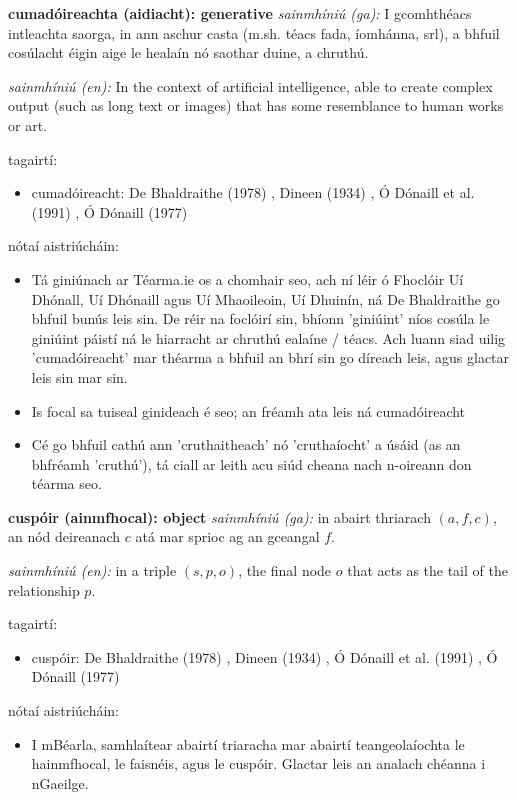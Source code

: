 \documentclass{article}
\begin{document}
\textbf{cumadóireachta (aidiacht): generative}
\textit{sainmhíniú (ga):} I gcomhthéacs intleachta saorga, in ann aschur casta (m.sh. téacs fada, íomhánna, srl), a bhfuil cosúlacht éigin aige le healaín nó saothar duine, a chruthú.

\textit{sainmhíniú (en):} In the context of artificial intelligence, able to create complex output (such as long text or images) that has some resemblance to human works or art.

tagairtí:
\begin{itemize}
	\item cumadóireacht: De Bhaldraithe (1978) \cite{de-bhaldraithe}, Dineen (1934) \cite{dineen}, Ó Dónaill et al. (1991) \cite{focloir-beag}, Ó Dónaill (1977) \cite{odonaill}
\end{itemize}

nótaí aistriúcháin:
\begin{itemize}
	\item Tá giniúnach ar Téarma.ie os a chomhair seo, ach ní léir ó Fhoclóir Uí Dhónall, Uí Dhónaill agus Uí Mhaoileoin, Uí Dhuinín, ná De Bhaldraithe go bhfuil bunús leis sin. De réir na foclóirí sin, bhíonn 'giniúint' níos cosúla le giniúint páistí ná le hiarracht ar chruthú ealaíne / téacs. Ach luann siad uilig 'cumadóireacht' mar théarma a bhfuil an bhrí sin go díreach leis, agus glactar leis sin mar sin.
	\item Is focal sa tuiseal ginideach é seo; an fréamh ata leis ná cumadóireacht
	\item Cé go bhfuil cathú ann 'cruthaitheach' nó 'cruthaíocht' a úsáid (as an bhfréamh 'cruthú'), tá ciall ar leith acu siúd cheana nach n-oireann don téarma seo.
\end{itemize}


\textbf{cuspóir (ainmfhocal): object}
\textit{sainmhíniú (ga):} in abairt thriarach $(a,f,c)$, an nód deireanach $c$ atá mar sprioc ag an gceangal $f$.

\textit{sainmhíniú (en):} in a triple $(s,p,o)$, the final node $o$ that acts as the tail of the relationship $p$.

tagairtí:
\begin{itemize}
	\item cuspóir: De Bhaldraithe (1978) \cite{de-bhaldraithe}, Dineen (1934) \cite{dineen}, Ó Dónaill et al. (1991) \cite{focloir-beag}, Ó Dónaill (1977) \cite{odonaill}
\end{itemize}

nótaí aistriúcháin:
\begin{itemize}
	\item I mBéarla, samhlaítear abairtí triaracha mar abairtí teangeolaíochta le hainmfhocal, le faisnéis, agus le cuspóir. Glactar leis an analach chéanna i nGaeilge.
\end{itemize}
\end{document}
